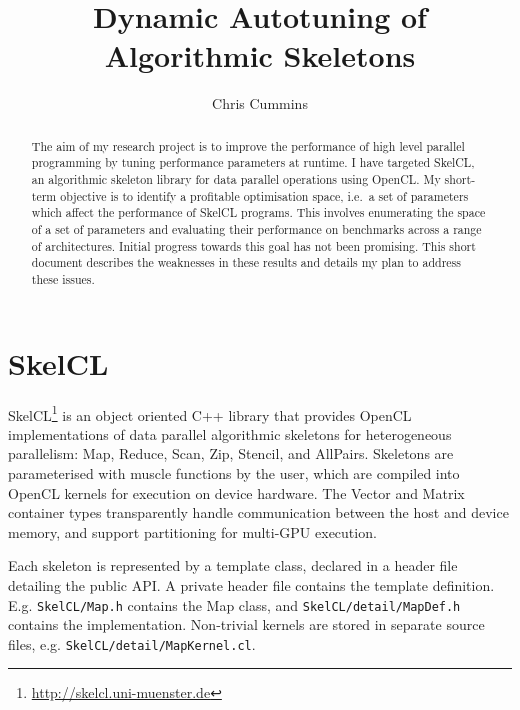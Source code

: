 
\title{Dynamic Autotuning of Algorithmic Skeletons}

\author{Chris Cummins}





\maketitle

\begin{abstract}
  \noindent
  The aim of my research project is to improve the performance of high
  level parallel programming by tuning performance parameters at
  runtime. I have targeted SkelCL, an algorithmic skeleton library for
  data parallel operations using OpenCL. My short-term objective is to
  identify a profitable optimisation space, i.e.\ a set of parameters
  which affect the performance of SkelCL programs. This involves
  enumerating the space of a set of parameters and evaluating their
  performance on benchmarks across a range of architectures. Initial
  progress towards this goal has not been promising. This short
  document describes the weaknesses in these results and details my
  plan to address these issues.
\end{abstract}

\section{SkelCL}

SkelCL\footnote{\url{http://skelcl.uni-muenster.de}} is an object
oriented C++ library that provides OpenCL implementations of data
parallel algorithmic skeletons for heterogeneous parallelism: Map,
Reduce, Scan, Zip, Stencil, and AllPairs. Skeletons are parameterised
with muscle functions by the user, which are compiled into OpenCL
kernels for execution on device hardware. The Vector and Matrix
container types transparently handle communication between the host
and device memory, and support partitioning for multi-GPU execution.

Each skeleton is represented by a template class, declared in a header
file detailing the public API. A private header file contains the
template definition. E.g. \texttt{SkelCL/Map.h} contains the Map
class, and \texttt{SkelCL/detail/MapDef.h} contains the
implementation. Non-trivial kernels are stored in separate source
files, e.g. \texttt{SkelCL/detail/MapKernel.cl}.

